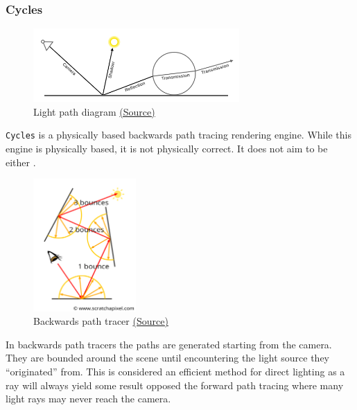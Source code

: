 \documentclass[11pt]{article}
\begin{document}
\subsubsection{Cycles}
\label{sec:orge074d8a}
\begin{figure}[htbp]
\centering
\includegraphics[width=0.7\textwidth]{Images/render_cycles_render-settings_light-paths_rays.png}
\caption{\label{light-path}Light path diagram \href{https://docs.blender.org/manual/en/latest/render/cycles/render\_settings/light\_paths.html}{(Source)}}
\end{figure}
\texttt{Cycles} is a physically based backwards path tracing rendering engine. While
this engine is  physically based, it is not physically correct. It does not aim
to be either \cite{design-goals}.\\

\newpage
\begin{figure}
\centering
\includegraphics[width=0.35\textwidth]{Images/shad2-globalillum1a.png}
\caption{Backwards path tracer \href{https://www.scratchapixel.com/lessons/3d-basic-rendering/global-illumination-path-tracing}{(Source)}}
\end{figure}
In backwards path tracers the paths are generated starting from the camera. They
are bounded around the scene until encountering the light source they ``originated'' from.
This is considered an efficient method for direct lighting as a ray will always
yield some result opposed the forward path tracing where many light rays may
never reach the camera.\\
\end{document}
